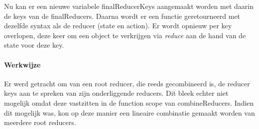 Nu kan er een nieuwe variabele finalReducerKeys aangemaakt worden met daarin de keys van de finalReducers. Daarna wordt er een functie geretourneerd met dezelfde syntax als de reducer (state en action). Er wordt opnieuw per key overlopen, deze keer om een object te verkrijgen via \textit{reduce} aan de hand van de state voor deze key.

\paragraph{Werkwijze}

Er werd getracht om van een root reducer, die reeds gecombineerd is, de reducer keys aan te spreken van zijn onderliggende reducers. Dit bleek echter niet mogelijk omdat deze vastzitten in de function scope van combineReducers. Indien dit mogelijk was, kon op deze manier een lineaire combinatie gemaakt worden van meerdere root reducers.


 




